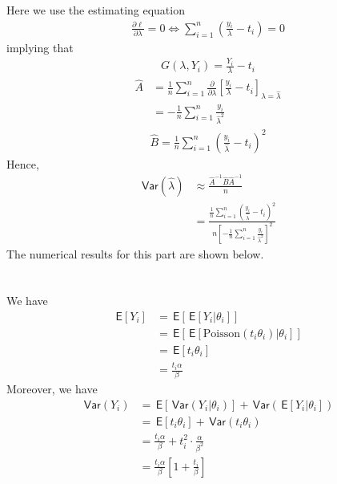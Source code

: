 \documentclass[11pt]{article}
\newcommand*\pd{\partial}
\newcommand*\ba{\[ \begin{aligned}}
\newcommand*\ea{\end{aligned} \]}
\newcommand*\E[1]{\;\mathsf{E}\left[#1\right]}
\newcommand*\Var[1]{\;\mathsf{Var}\left(#1\right)}
\newcommand*\estim[1]{\widehat{#1}}
\newcommand*\pderiv[2]{\frac{\pd #1}{\pd #2}}
\renewcommand\;{\,}
\begin{document}
\section{}
Here we use the estimating equation
\ba
\pderiv{\ell}{\lambda} = 0
	\iff
	\sum_{i=1}^n \left( \frac{y_i}{\lambda} - t_i \right) = 0
\ea
implying that
\ba
G(\lambda, Y_i) = \frac{Y_i}{\lambda} - t_i
\ea
\ba
\estim{A} & = \frac{1}{n} \sum_{i=1}^n
		\pderiv{}{\lambda} \left[ \frac{y_i}{\lambda} 
		- t_i \right]_{\lambda = \estim\lambda} \\
	& = -\frac{1}{n} \sum_{i=1}^n \frac{y_i}{\estim\lambda^2}
\ea
\ba
\estim B = \frac{1}{n} \sum_{i=1}^n 
	\left( \frac{y_i}{\estim{\lambda}} - t_i \right)^2
\ea
Hence,
\ba
\Var{\estim{\lambda}}
	& \approx
	\frac{\estim A^{-1} \estim B \estim A^{-1}}{n} \\
	& = \frac{ \frac{1}{n} \sum_{i=1}^n 
	\left( \frac{y_i}{\estim{\lambda}} - t_i \right)^2 }
	{ n \left[ -\frac{1}{n} \sum_{i=1}^n \frac{y_i}{\estim\lambda^2} \right]^2 }
\ea
The numerical results for this part are shown below.

\section{}
We have
\ba
\E{Y_i} & = \E{\E{Y_i | \theta_i}} \\
	& = \E{\E{ \text{Poisson}(t_i \theta_i) | \theta_i } } \\
	& = \E{ t_i \theta_i } \\
	& = \boxed{ \frac{ t_i \alpha }{\beta} }
\ea
Moreover, we have
\ba
\Var{ Y_i } & = \E{ \Var{Y_i | \theta_i} }
		+ \Var{ \E{ Y_i | \theta_i } } \\
	& = \E{ t_i \theta_i } + \Var{ t_i \theta_i } \\
	& = \frac{t_i \alpha}{\beta} + t_i^2 \cdot \frac{\alpha}{\beta^2} \\
	& = \boxed{ \frac{t_i \alpha}{\beta} \left[ 1 + \frac{t_i}{\beta} \right] }
\ea
\end{document}
